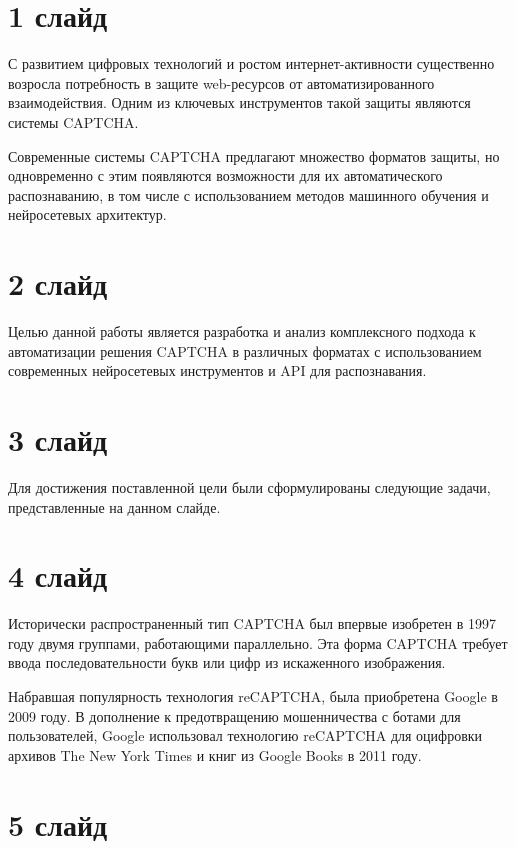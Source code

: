 \documentclass{altsu-report}
\begin{document}
\section*{1 слайд}

С развитием цифровых технологий и ростом интернет-активности существенно возросла 
потребность в защите web-ресурсов от автоматизированного взаимодействия. Одним 
из ключевых инструментов такой защиты являются системы CAPTCHA.

Современные системы CAPTCHA предлагают множество форматов защиты, но одновременно 
с этим появляются возможности для их автоматического распознаванию, в том числе с 
использованием методов машинного обучения и нейросетевых архитектур.

\section*{2 слайд}

Целью данной работы является разработка и анализ комплексного подхода к 
автоматизации решения CAPTCHA в различных форматах с использованием современных 
нейросетевых инструментов и API для распознавания.

\section*{3 слайд}

Для достижения поставленной цели были сформулированы следующие задачи, 
представленные на данном слайде.

\section*{4 слайд}

Исторически распространенный тип CAPTCHA был впервые изобретен в 1997 году двумя 
группами, работающими параллельно. Эта форма CAPTCHA требует ввода 
последовательности букв или цифр из искаженного изображения.

Набравшая популярность технология reCAPTCHA, была приобретена Google в 2009 году. 
В дополнение к предотвращению мошенничества с ботами для пользователей, Google 
использовал технологию reCAPTCHA для оцифровки архивов The New York Times и книг 
из Google Books в 2011 году.

\section*{5 слайд}
\end{document}
